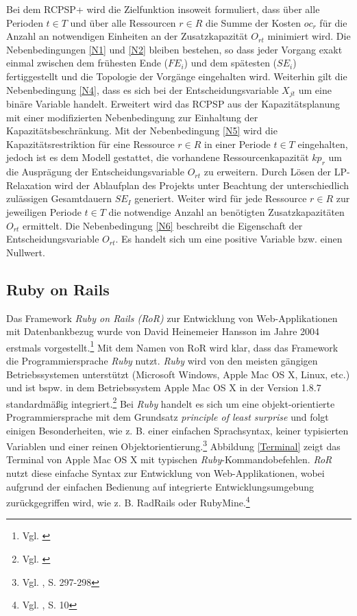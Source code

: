 \documentclass[a4paper,12pt,parskip,bibtotoc,liststotoc]{article}
\begin{document}
Bei dem RCPSP+ wird die Zielfunktion insoweit formuliert, dass über alle Perioden $t\in T$ und über alle Ressourcen $r\in R$ die Summe der Kosten $oc_r$ für die Anzahl an notwendigen Einheiten an der Zusatzkapazität $O_{rt}$ minimiert wird. Die Nebenbedingungen \eqref{N1} und \eqref{N2} bleiben bestehen, so dass jeder Vorgang exakt einmal zwischen dem frühesten Ende ($FE_i$) und dem spätesten ($SE_i$) fertiggestellt und die Topologie der Vorgänge eingehalten wird. Weiterhin gilt die Nebenbedingung \eqref{N4}, dass es sich bei der Entscheidungsvariable $X_{jt}$ um eine binäre Variable handelt. Erweitert wird das RCPSP aus der Kapazitätsplanung mit einer modifizierten Nebenbedingung zur Einhaltung der Kapazitätsbeschränkung. Mit der Nebenbedingung \eqref{N5} wird die Kapazitätsrestriktion für eine Ressource $r\in R$ in einer Periode $t\in T$ eingehalten, jedoch ist es dem Modell gestattet, die vorhandene Ressourcenkapazität $kp_r$ um die Ausprägung der Entscheidungsvariable $O_{rt}$ zu erweitern. Durch Lösen der LP-Relaxation wird der Ablaufplan des Projekts unter Beachtung der unterschiedlich zulässigen Gesamtdauern $SE_I$ generiert. Weiter wird für jede Ressource $r\in R$ zur jeweiligen Periode $t\in T$ die notwendige Anzahl an benötigten Zusatzkapazitäten $O_{rt}$ ermittelt. Die Nebenbedingung \eqref{N6} beschreibt die Eigenschaft der Entscheidungsvariable $O_{rt}$. Es handelt sich um eine positive Variable bzw. einen Nullwert.

\subsection{Ruby on Rails}
Das Framework \textit{Ruby on Rails (RoR)} zur Entwicklung von Web-Applikationen mit Datenbankbezug wurde von David Heinemeier Hansson im Jahre 2004 erstmals vorgestellt.\footnote{Vgl. \cite{ruby2004}} Mit dem Namen von RoR wird klar, dass das Framework die Programmiersprache \textit{Ruby} nutzt. \textit{Ruby} wird von den meisten gängigen Betriebssystemen unterstützt (Microsoft Windows, Apple Mac OS X, Linux, etc.) und ist bspw. in dem Betriebssystem Apple Mac OS X in der Version 1.8.7 standardmäßig integriert.\footnote{Vgl. \cite{ruby-schienen}} Bei \textit{Ruby} handelt es sich um eine objekt-orientierte Programmiersprache mit dem Grundsatz \textit{principle of least surprise} und folgt einigen Besonderheiten, wie z. B. einer einfachen Sprachsyntax, keiner typisierten Variablen und einer reinen Objektorientierung.\footnote{Vgl. \cite{Walter:2008aa}, S. 297-298} Abbildung \ref{Terminal} zeigt das Terminal von Apple Mac OS X mit typischen \textit{Ruby}-Kommandobefehlen. \textit{RoR} nutzt diese einfache Syntax zur Entwicklung von Web-Applikationen, wobei aufgrund der einfachen Bedienung auf integrierte Entwicklungsumgebung zurückgegriffen wird, wie z. B. RadRails oder RubyMine.\footnote{Vgl. \cite{hartl2012ruby}, S. 10} \\
\end{document}
